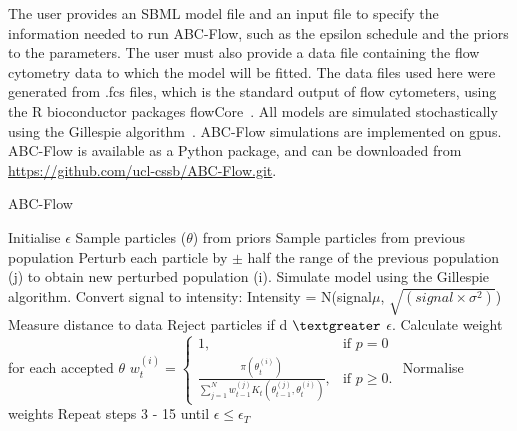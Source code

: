 The user provides an SBML model file and an input file to specify the information needed to run ABC-Flow, such as the epsilon schedule and the priors to the parameters. The user must also provide a data file containing the flow cytometry data to which the model will be fitted. The data files used here were generated from .fcs files, which is the standard output of flow cytometers, using the R bioconductor packages flowCore~\autocite{flowCore:man}. All models are simulated stochastically using the Gillespie algorithm~\autocite{Gillespie:1977ww}. ABC-Flow simulations are implemented on \acrshort{gpu}s. ABC-Flow is available as a Python package, and can be downloaded from \url{https://github.com/ucl-cssb/ABC-Flow.git}. 



\begin{algorithm}[htbp]

\caption{ABC-Flow}
\label{alg:abc-flow}
 \begin{algorithmic}[1]
 	\Statex
 	
	\State Initialise $\epsilon$ 
		\State Sample particles ($\theta$) from priors
		\Else
			\State Sample particles from previous population
			\State Perturb each particle by $\pm$ half the range of the previous population (j) to obtain new perturbed population (i).
	\EndIf
	\State Simulate model using the Gillespie algorithm.
	\State Convert signal to intensity: 
					\State Intensity = N\bigg(signal\times$\mu$,  $\sqrt{(signal\times\sigma^2)}$\bigg)
	\EndFor				
	\EndFor	
	\EndFor	
	\EndFor	
	\State Measure distance to data
	\State Reject particles if d $\textgreater$ $\epsilon$.
    \State Calculate weight for each accepted $\theta$
	\State $w_{t}^{(i)} = \begin{cases} 1, & \mbox{if } p = 0 \\\frac{\pi(\theta_{t}^{(i)})}{\sum_{j=1}^N w_{t-1}^{(j)} K_{t}(\theta_{t-1}^{(j)}, \theta_{t}^{(i)})}, & \mbox{if } p \geq  0. \end{cases}$
	\State Normalise weights
	\State Repeat steps 3 - 15 until $\epsilon \leq \epsilon_T$	%
  \end{algorithmic}
\end{algorithm}


